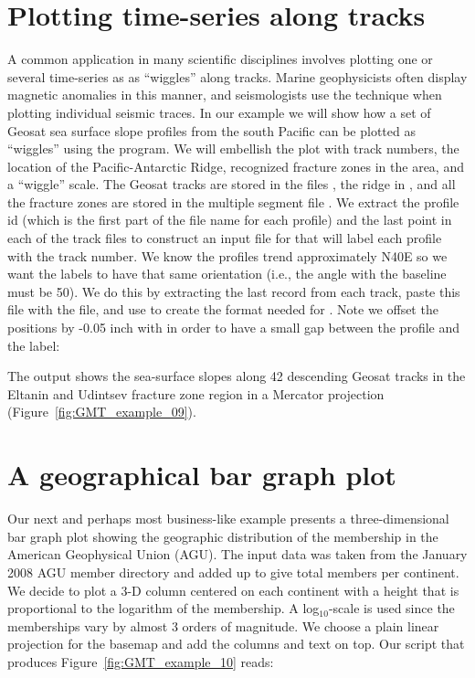 
\section{Plotting time-series along tracks}

A common application in many scientific disciplines involves
plotting one or several time-series as as ``wiggles'' along
tracks.  Marine geophysicists often display magnetic anomalies
in this manner, and seismologists use the technique when
plotting individual seismic traces.  In our example we will
show how a set of Geosat sea surface slope profiles from the
south Pacific can be plotted as ``wiggles'' using the
 program. We will embellish the plot with track
numbers, the location of the Pacific-Antarctic Ridge, recognized
fracture zones in the area, and a ``wiggle'' scale.  The
Geosat tracks are stored in the files , the ridge in
, and all the fracture zones are stored in the multiple
segment file .  We extract the profile id (which is the
first part of the file name for each profile) and the last point
in each of the track files to construct an input file for
 that will label each profile with the track
number.  We know the profiles trend approximately N40\DS E
so we want the labels to have that same orientation (i.e., the
angle with the baseline must be 50\DS ).  We do this by
extracting the last record from each track, paste this file
with the  file, and use  to create the
format needed for .  Note we offset the positions
by -0.05 inch with  in order to have a small gap
between the profile and the label:


The output shows the sea-surface slopes along 42 descending
Geosat tracks in the Eltanin and Udintsev fracture zone
region in a Mercator projection (Figure~\ref{fig:GMT_example_09}).


\section{A geographical bar graph plot}

Our next and perhaps most business-like example presents a
three-dimensional bar graph plot showing the geographic
distribution of the membership in the American Geophysical
Union (AGU).  The input data was taken from the January 2008 AGU
member directory and added up to give total members per
continent.  We decide to plot a 3-D column centered on
each continent with a height that is proportional to the
logarithm of the membership.  A log$_{10}$-scale is
used since the memberships vary by almost 3 orders of
magnitude.  We choose a plain linear projection for the
basemap and add the columns and text on top. Our script that produces Figure~\ref{fig:GMT_example_10} reads:

